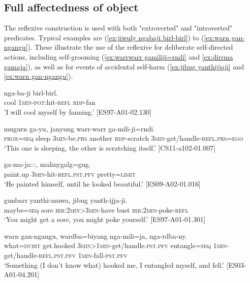 \documentclass[output=paper,colorlinks,citecolor=brown]{langscibook}
\begin{document}
\subsection{Full affectedness of object} \label{sec:SchultzeBernd:4.1}

 The reflexive construction is used with both "extroverted" and "introverted" predicates. Typical examples are (\ref{ex:jiwuly ngabaji birl-birl}) to (\ref{ex:warn gan-ngangu}). These illustrate the use of the reflexive for deliberate self-directed actions, including self-grooming (\ref{ex:warrwarr gamiliji=rndi} and \ref{ex:dirrma gamaja}), as well as for events of accidental self-harm (\ref{ex:jibug yanthijjaji} and \ref{ex:warn gan-ngangu}).

\ea
{} n{ga-ba-ji} {birl-birl}. \\
cool \textsc{1min-pot}:hit-\textsc{refl} \textsc{rdp-}fan \\
\glt 'I will cool myself by fanning.' [ES97-A01-02.130]
\label{ex:jiwuly ngabaji birl-birl}
\z

\ea
{} {mugurn} {ga-yu}, {janyung} {warr-warr} {ga-mili-ji=rndi}. \\
\textsc{prox=seq}  sleep \textsc{3min}-be.\textsc{prs}  another \textsc{rdp-}scratch \textsc{3min}-get/handle-\textsc{refl.prs=ego} \\
\glt `This one is sleeping, the other is scratching itself.' [CS11-a102-01.007]
\label{ex:warrwarr gamiliji=rndi}
\z

\ea
{} {ga-ma-ja:::}, {malinygalg=gug}. \\
paint.up \textsc{3min}-hit-\textsc{refl.pst.pfv} pretty\textsc{=limit}  \\
\glt `He painted himself, until he looked beautiful.' [ES09-A02-01.016]
\label{ex:dirrma gamaja}
\z

\ea
{} {gunbarr} {yanthi-muwa}, {jibug} {yanth-ijja-ji}. \\
maybe\textsc{=seq} sore \textsc{irr:2min>3min}-have bust \textsc{irr:2min}-poke-\textsc{refl} \\
\glt `You might get a sore, you might poke yourself.' [ES97-A01-01.301]
\label{ex:jibug yanthijjaji}
\z

\ea
{} {warn} {gan-ngangu}, {wardba=biyang} {nga-mili=ja}, {nga-rdba-ny}. \\
what\textsc{=dubit} get.hooked \textsc{3min>1min}-get/handle.\textsc{pst.pfv} entangle\textsc{=seq} \textsc{1min}-get/handle-\textsc{refl.pst.pfv} \textsc{1min}-fall-\textsc{pst.pfv} \\
\glt `Something (I don't know what) hooked me, I  entangled myself, and fell.' [ES03-A01-04.201]
\label{ex:warn gan-ngangu}
\z
\end{document}
